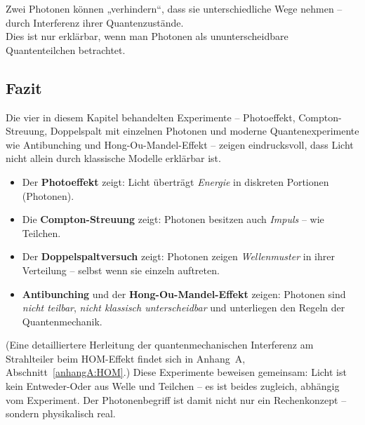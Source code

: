 \medskip
\begin{tcolorbox}[physikbox, title=Was der HOM-Effekt zeigt]
	\label{box:HOM-Effekt}
	\small
	Zwei Photonen können „verhindern“, dass sie unterschiedliche Wege nehmen – durch Interferenz ihrer Quantenzustände.\\
	Dies ist nur erklärbar, wenn man Photonen als ununterscheidbare Quantenteilchen betrachtet.
\end{tcolorbox}

\subsection{Fazit}

\begin{tcolorbox}[hinweisbox, title=Was die Experimente über Licht zeigen]
	\label{box:was die Experimente}
	\small
	Die vier in diesem Kapitel behandelten Experimente – Photoeffekt, Compton-Streuung, Doppelspalt mit einzelnen Photonen und moderne Quantenexperimente wie Antibunching und Hong-Ou-Mandel-Effekt – zeigen eindrucksvoll, dass Licht nicht allein durch klassische Modelle erklärbar ist.
	
	\begin{itemize}
		\item Der \textbf{Photoeffekt} zeigt: Licht überträgt \emph{Energie} in diskreten Portionen (Photonen).
		\item Die \textbf{Compton-Streuung} zeigt: Photonen besitzen auch \emph{Impuls} – wie Teilchen.
		\item Der \textbf{Doppelspaltversuch} zeigt: Photonen zeigen \emph{Wellenmuster} in ihrer Verteilung – selbst wenn sie einzeln auftreten.
		\item \textbf{Antibunching} und der \textbf{Hong-Ou-Mandel-Effekt} zeigen: Photonen sind \emph{nicht teilbar}, \emph{nicht klassisch unterscheidbar} und unterliegen den Regeln der Quantenmechanik.
	\end{itemize}
	(Eine detailliertere Herleitung der quantenmechanischen Interferenz am Strahlteiler beim HOM-Effekt findet sich in Anhang~A, Abschnitt~\ref{anhangA:HOM}.) %
	Diese Experimente beweisen gemeinsam: Licht ist kein Entweder-Oder aus Welle und Teilchen – es ist beides zugleich, abhängig vom Experiment. Der Photonenbegriff ist damit nicht nur ein Rechenkonzept – sondern physikalisch real.
\end{tcolorbox}
